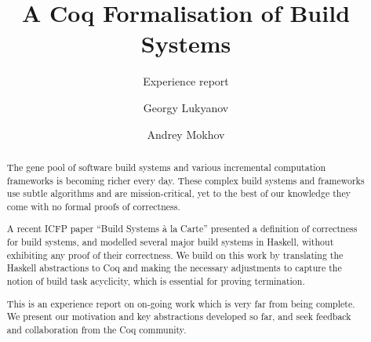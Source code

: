 \documentclass[sigplan,review]{acmart}\settopmatter{printfolios=true,printccs=false,printacmref=false}
\begin{document}
\title[]{A Coq Formalisation of Build Systems}         %
\subtitle{Experience report}                     %



\author{Georgy Lukyanov}

\author{Andrey Mokhov}

\begin{abstract}
The gene pool of software build systems and various incremental computation
frameworks is becoming richer every day. These complex build systems and
frameworks use subtle algorithms and are mission-critical, yet to the best of
our knowledge they come with no formal proofs of correctness.


A recent ICFP paper ``Build Systems \`a la Carte'' presented a definition of
correctness for build systems, and modelled several major build systems in
Haskell, without exhibiting any proof of their correctness. We build on this
work by translating the Haskell abstractions to Coq and making the necessary
adjustments to capture the notion of build task acyclicity, which is essential
for proving termination.

This is an experience report on on-going work which is very far from being
complete. We present our motivation and key abstractions developed so far, and
seek feedback and collaboration from the Coq community.
\end{abstract}
\end{document}
